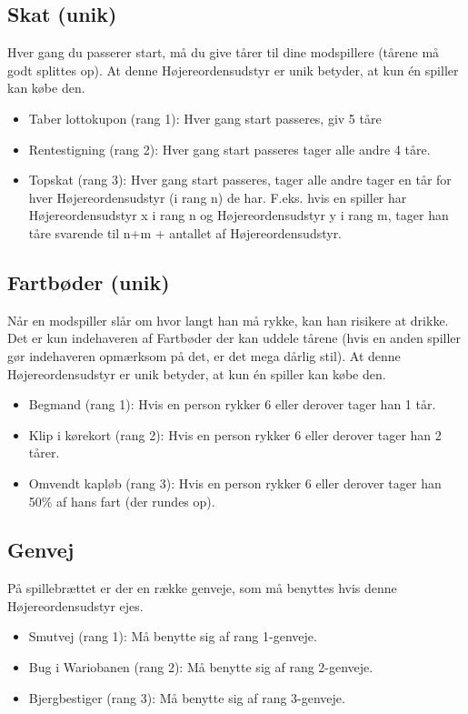 \documentclass{article}
\begin{document}
\subsection{Skat (unik)}
Hver gang du passerer start, må du give tårer til dine modspillere (tårene må godt splittes op). At denne Højereordensudstyr er unik betyder, at kun én spiller kan købe den.

\begin{itemize}
	\item Taber lottokupon (rang 1): Hver gang start passeres, giv 5 tåre
	\item Rentestigning (rang 2): Hver gang start passeres tager alle andre 4 tåre.
	\item Topskat (rang 3): Hver gang start passeres, tager alle andre tager en tår for hver Højereordensudstyr (i rang n) de har. F.eks. hvis en spiller har Højereordensudstyr x i rang n og Højereordensudstyr y i rang m, tager han tåre svarende til n+m + antallet af Højereordensudstyr.
\end{itemize}
 
\subsection{Fartbøder (unik)}
Når en modspiller slår om hvor langt han må rykke, kan han risikere at drikke. Det er kun indehaveren af Fartbøder der kan uddele tårene (hvis en anden spiller gør indehaveren opmærksom på det, er det mega dårlig stil). At denne Højereordensudstyr er unik betyder, at kun én spiller kan købe den. 
 
\begin{itemize}
	\item Begmand (rang 1): Hvis en person rykker 6 eller derover tager han 1 tår.
	\item Klip i kørekort (rang 2): Hvis en person rykker 6 eller derover tager han 2 tårer.
	\item Omvendt kapløb (rang 3): Hvis en person rykker 6 eller derover tager han 50\% af hans fart (der rundes op).
\end{itemize}

\subsection{Genvej}
På spillebrættet er der en række genveje, som må benyttes hvis denne Højereordensudstyr ejes. 

\begin{itemize}
	\item Smutvej (rang 1): Må benytte sig af rang 1-genveje.
	\item Bug i Wariobanen (rang 2): Må benytte sig af rang 2-genveje.
	\item Bjergbestiger (rang 3): Må benytte sig af rang 3-genveje.
\end{itemize}
 
\end{document}
